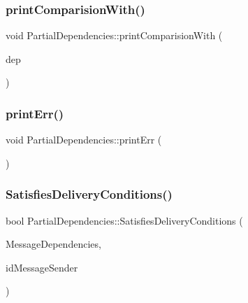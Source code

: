 \subsubsection{\texorpdfstring{print\+Comparision\+With()}{printComparisionWith()}}
{\footnotesize\ttfamily void Partial\+Dependencies\+::print\+Comparision\+With (\begin{DoxyParamCaption}\item[{const \hyperlink{classPartialDependencies}{Partial\+Dependencies} \&}]{dep }\end{DoxyParamCaption})}

\mbox{\label{classPartialDependencies_ac4c98e7d381b9e9efa54a094d1da729d}} 
\subsubsection{\texorpdfstring{print\+Err()}{printErr()}}
{\footnotesize\ttfamily void Partial\+Dependencies\+::print\+Err (\begin{DoxyParamCaption}{ }\end{DoxyParamCaption})}

\mbox{\label{classPartialDependencies_a67a733dba9069541f83fecee520ccce1}} 
\subsubsection{\texorpdfstring{Satisfies\+Delivery\+Conditions()}{SatisfiesDeliveryConditions()}}
{\footnotesize\ttfamily bool Partial\+Dependencies\+::\+Satisfies\+Delivery\+Conditions (\begin{DoxyParamCaption}\item[{const \hyperlink{classPartialDependencies}{Partial\+Dependencies} \&}]{Message\+Dependencies,  }\item[{unsigned int}]{id\+Message\+Sender }\end{DoxyParamCaption})}

\mbox{\label{classPartialDependencies_ad60f5e87d6d7e027c399bd1a8206a952}} 
